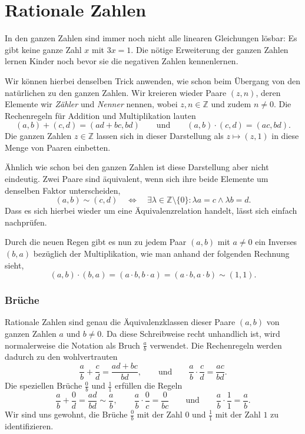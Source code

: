 %
%
%
\section{Rationale Zahlen
\label{buch:section:rationale-zahlen}}
In den ganzen Zahlen sind immer noch nicht alle linearen Gleichungen
lösbar: Es gibt keine ganze Zahl $x$ mit $3x=1$.
Die nötige Erweiterung der ganzen Zahlen lernen Kinder noch bevor sie
die negativen Zahlen kennenlernen.

Wir können hierbei denselben Trick anwenden,
wie schon beim Übergang von den natürlichen zu den ganzen Zahlen.
Wir kreieren wieder Paare $(z, n)$, deren Elemente wir \emph{Zähler} und
\emph{Nenner} nennen, wobei $z, n \in \mathbb Z$ und zudem $n \ne 0$.
Die Rechenregeln für Addition und Multiplikation lauten
\[
(a, b) + (c, d)
=
(ad + bc, bd)
\qquad \text{und} \qquad
(a, b) \cdot (c, d)
=
(ac, bd)
.
\]
Die ganzen Zahlen $z\in\mathbb{Z}$ lassen sich in dieser Darstellung als
$z \mapsto (z, 1)$ in diese Menge von Paaren einbetten.

Ähnlich wie schon bei den ganzen Zahlen ist diese Darstellung
aber nicht eindeutig.
Zwei Paare sind äquivalent, wenn sich ihre beide Elemente um denselben
Faktor unterscheiden,
\[
(a, b)
\sim
(c, d)
\quad \Leftrightarrow \quad
\exists \lambda \in \mathbb Z\setminus\{0\} \colon
\lambda a = c
\wedge
\lambda b = d
.
\]
Dass es sich hierbei wieder um eine Äquivalenzrelation handelt, lässt sich
einfach nachprüfen.

Durch die neuen Regen gibt es nun zu jedem Paar $(a, b)$ mit $a \ne 0$
ein Inverses $(b, a)$ bezüglich der Multiplikation,
wie man anhand der folgenden Rechnung sieht,
\[
(a, b) \cdot (b, a)
=
(a \cdot b, b \cdot a)
=
(a \cdot b, a \cdot b)
\sim
(1, 1)
.
\]

\subsubsection{Brüche}
Rationale Zahlen sind genau die Äquivalenzklassen dieser Paare $(a, b)$ von
ganzen Zahlen $a$ und $b\ne 0$.
Da diese Schreibweise recht unhandlich ist, wird normalerweise die Notation
als Bruch $\frac{a}{b}$ verwendet.
%
Die Rechenregeln werden dadurch zu den wohlvertrauten
\[
\frac{a}{b}+\frac{c}{d}
=
\frac{ad+bc}{bd},
\qquad\text{und}\qquad
\frac{a}{b}\cdot\frac{c}{d}
=
\frac{ac}{bd}.
\]
Die speziellen Brüche $\frac{0}{b}$ und $\frac{1}{1}$ erfüllen die
Regeln
\[
\frac{a}{b}+\frac{0}{d} = \frac{ad}{bd} \sim \frac{a}{b},
\qquad
\frac{a}{b}\cdot \frac{0}{c} = \frac{0}{bc}
\qquad\text{und}\qquad
\frac{a}{b}\cdot \frac{1}{1} = \frac{a}{b}.
\]
Wir sind uns gewohnt, die Brüche $\frac{0}{b}$ mit der Zahl $0$ und
$\frac{1}{1}$ mit der Zahl $1$ zu identifizieren.

